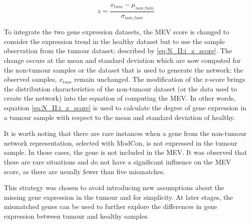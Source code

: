 \begin{equation} \label{eq:N_II:i_z_score}
z = \frac{x_{tum} - \mu_{non\_tum}}{\sigma_{non\_tum}}
\end{equation}

To integrate the two gene expression datasets, the MEV score is changed to consider the expression trend in the healthy dataset but to use the sample observation from the tumour dataset; described by \cref{eq:N_II:i_z_score}. The change occurs at the mean and standard deviation which are now computed for the non-tumour samples or the dataset that is used to generate the network; the observed samples, $x_{tum}$ remain unchanged. The modification of the z-score brings the distribution characteristics of the non-tumour dataset (or the data used to create the network) into the equation of computing the MEV. In other words, equation \cref{eq:N_II:i_z_score} is used to calculate the degree of gene expression in a tumour sample with respect to the mean and standard deviation of healthy.

It is worth noting that there are rare instances when a gene from the non-tumour network representation, selected with ModCon, is not expressed in the tumour sample. In those cases, the gene is not included in the MEV. It was observed that these are rare situations and do not have a significant influence on the MEV score, as there are usually fewer than five mismatches.

This strategy was chosen to avoid introducing new assumptions about the missing gene expression in the tumour and for simplicity. At later stages, the mismatched genes can be used to further explore the differences in gene expression between tumour and healthy samples.
